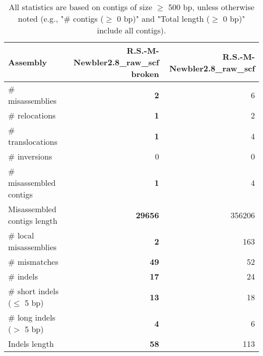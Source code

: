 \documentclass[12pt,a4paper]{article}
\begin{document}
\begin{table}[ht]
\begin{center}
\caption{All statistics are based on contigs of size $\geq$ 500 bp, unless otherwise noted (e.g., "\# contigs ($\geq$ 0 bp)" and "Total length ($\geq$ 0 bp)" include all contigs).}
\begin{tabular}{|l*{2}{|r}|}
\hline
Assembly & R.S.-M-Newbler2.8\_raw\_scf broken & R.S.-M-Newbler2.8\_raw\_scf \\ \hline
\# misassemblies & {\bf 2} & 6 \\ \hline
\hspace{5mm}\# relocations & {\bf 1} & 2 \\ \hline
\hspace{5mm}\# translocations & {\bf 1} & 4 \\ \hline
\hspace{5mm}\# inversions & 0 & 0 \\ \hline
\# misassembled contigs & {\bf 1} & 4 \\ \hline
Misassembled contigs length & {\bf 29656} & 356206 \\ \hline
\# local misassemblies & {\bf 2} & 163 \\ \hline
\# mismatches & {\bf 49} & 52 \\ \hline
\# indels & {\bf 17} & 24 \\ \hline
\hspace{5mm}\# short indels ($\leq$ 5 bp) & {\bf 13} & 18 \\ \hline
\hspace{5mm}\# long indels ($>$ 5 bp) & {\bf 4} & 6 \\ \hline
Indels length & {\bf 58} & 113 \\ \hline
\end{tabular}
\end{center}
\end{table}
\end{document}
